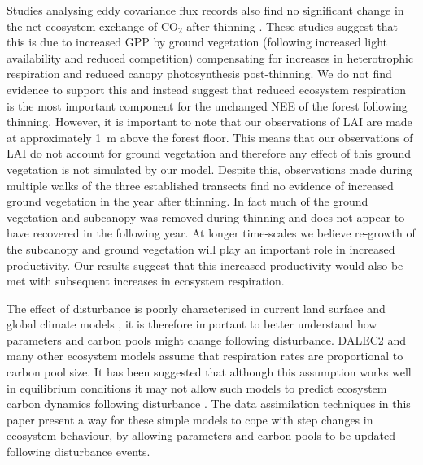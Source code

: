 \documentclass[draft,linenumbers]{agujournal}
\begin{document}
Studies analysing eddy covariance flux records also find no significant change in the net ecosystem exchange of CO\(_{2}\) after thinning \citep{vesala2005effect, wilkinson2015effects, moreaux2011paired, dore2012recovery}. These studies suggest that this is due to increased GPP by ground vegetation (following increased light availability and reduced competition) compensating for increases in heterotrophic respiration and reduced canopy photosynthesis post-thinning. We do not find evidence to support this and instead suggest that reduced ecosystem respiration is the most important component for the unchanged NEE of the forest following thinning. However, it is important to note that our observations of LAI are made at approximately 1~m above the forest floor. This means that our observations of LAI do not account for ground vegetation and therefore any effect of this ground vegetation is not simulated by our model. Despite this, observations made during multiple walks of the three established transects find no evidence of increased ground vegetation in the year after thinning. In fact much of the ground vegetation and subcanopy was removed during thinning and does not appear to have recovered in the following year. At longer time-scales we believe re-growth of the subcanopy and ground vegetation will play an important role in increased productivity. Our results suggest that this increased productivity would also be met with subsequent increases in ecosystem respiration.






The effect of disturbance is poorly characterised in current land surface and global climate models \citep{running2008ecosystem}, it is therefore important to better understand how parameters and carbon pools might change following disturbance. DALEC2 and many other ecosystem models assume that respiration rates are proportional to carbon pool size. It has been suggested that although this assumption works well in equilibrium conditions it may not allow such models to predict ecosystem carbon dynamics following disturbance \citep{schimel2003implications}. The data assimilation techniques in this paper present a way for these simple models to cope with step changes in ecosystem behaviour, by allowing parameters and carbon pools to be updated following disturbance events. 
\end{document}

